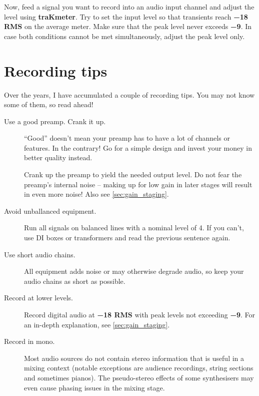 Now, feed a signal you want to record into an audio input channel and
adjust the level using \textbf{traKmeter}.  Try to set the input level
so that transients reach \textbf{\SI{-18}{\dBFS} RMS} on the average
meter.  Make sure that the peak level never exceeds
\textbf{\SI{-9}{\dBFS}}.  In case both conditions cannot be met
simultaneously, adjust the peak level only.

\chapter{Recording tips}
\label{chap:recording_tips}

Over the years, I have accumulated a couple of recording tips.  You
may not know some of them, so read ahead!

\begin{description}

\item[Use a good preamp.  Crank it up.]  ``Good'' doesn't mean your
  preamp has to have a lot of channels or features.  In the contrary!
  Go for a simple design and invest your money in better quality
  instead.

  Crank up the preamp to yield the needed output level.  Do not fear
  the preamp's internal noise -- making up for low gain in later
  stages will result in even more noise!  Also see
  \ref{sec:gain_staging}.

\item[Avoid unballanced equipment.]  Run all signals on balanced lines
  with a nominal level of \SI[addsign=all]{+4}{\dBu}.  If you can't,
  use DI boxes or transformers and read the previous sentence again.

\item[Use short audio chains.]  All equipment adds noise or may
  otherwise degrade audio, so keep your audio chains as short as
  possible.

\item[Record at lower levels.]  Record digital audio at
  \textbf{\SI{-18}{\dBFS} RMS} with peak levels not exceeding
  \textbf{\SI{-9}{\dBFS}}.  For an in-depth explanation, see
  \ref{sec:gain_staging}.

\item[Record in mono.]  Most audio sources do not contain stereo
  information that is useful in a mixing context (notable exceptions
  are audience recordings, string sections and sometimes pianos).  The
  pseudo-stereo effects of some synthesisers may even cause phasing
  issues in the mixing stage.


\end{description}
